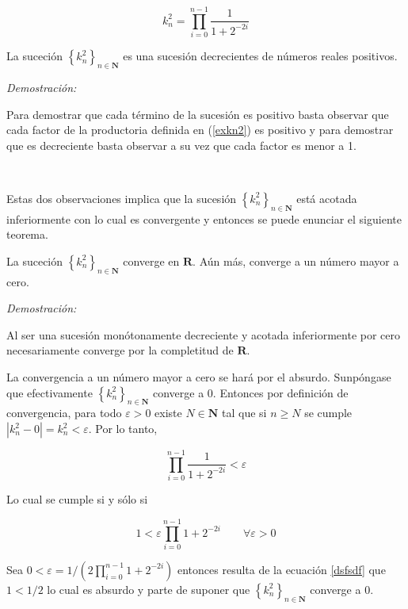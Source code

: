 \begin{equation}\label{exkn2}
k_n^2=\prod_{i=0}^{n-1}{\frac{1}{1+2^{-2i}}}
\end{equation}

\begin{prop}
La suceción $\left\{k_n^2\right\}_{n\in\mathbf{N}}$ es una sucesión decrecientes de números reales positivos.
\end{prop}

\emph{Demostración:}

Para demostrar que cada término de la sucesión es positivo basta observar que cada factor de la productoria definida en
 (\ref{exkn2}) es positivo y para demostrar que es decreciente basta observar a su vez que cada factor es menor a 1.

\

Estas dos observaciones implica que la sucesión $\left\{k_n^2\right\}_{n\in\mathbf{N}}$ está acotada inferiormente con
lo cual es convergente y entonces se puede enunciar el siguiente teorema.

\begin{teor}
La suceción $\left\{k_n^2\right\}_{n\in\mathbf{N}}$ converge en $\mathbf{R}$. Aún más, converge a un número mayor a cero.
\end{teor}

\emph{Demostración:}

Al ser una sucesión monótonamente decreciente y acotada inferiormente por cero necesariamente converge por la
completitud de $\mathbf{R}$.

La convergencia a un número mayor a cero se hará por el absurdo. Sunpóngase que efectivamente
$\left\{k_n^2\right\}_{n\in\mathbf{N}}$ converge a 0. Entonces por definición de convergencia, para todo
$\varepsilon >0$ existe $N \in \mathbf{N}$ tal que si $n\geq N$ se cumple $|k_n^2-0|=k_n^2<\varepsilon$. Por lo tanto,

\begin{equation}
\prod_{i=0}^{n-1}{\frac{1}{1+2^{-2i}}}<\varepsilon
\end{equation}

Lo cual se cumple si y sólo si

\begin{equation}\label{dsfsdf}
1 < \varepsilon \prod_{i=0}^{n-1}{1+2^{-2i}} \qquad \forall \varepsilon > 0
\end{equation}

Sea $0 < \varepsilon = 1/(2\prod_{i=0}^{n-1}{1+2^{-2i}})$ entonces resulta de la ecuación  \ref{dsfsdf} que $1<1/2$ lo
cual es absurdo y parte de suponer que $\left\{k_n^2\right\}_{n\in\mathbf{N}}$ converge a 0.

